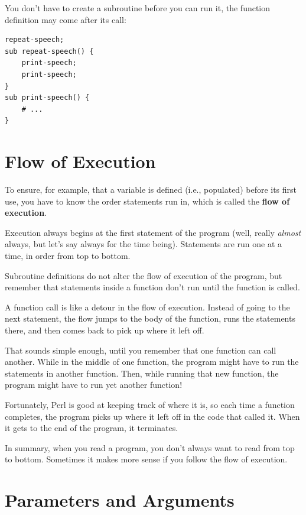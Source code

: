 You don't have to create a subroutine before you can run it, 
the function definition may come after its call:
\begin{verbatim}
repeat-speech;
sub repeat-speech() {
    print-speech;
    print-speech;
}
sub print-speech() {
    # ...
}
\end{verbatim}


\section{Flow of Execution}

To ensure, for example, that a variable is defined (i.e., populated) 
before its first use, you have to know the order statements run in, 
which is called the {\bf flow of execution}.

Execution always begins at the first statement of the program 
(well, really \emph{almost} always, but let's say always 
for the time being). Statements are run one at a time, 
in order from top to bottom.

Subroutine definitions do not alter the flow of execution of the
program, but remember that statements inside a function don't
run until the function is called.

A function call is like a detour in the flow of execution. Instead of
going to the next statement, the flow jumps to the body of
the function, runs the statements there, and then comes back
to pick up where it left off.

That sounds simple enough, until you remember that one function can
call another.  While in the middle of one function, the program might
have to run the statements in another function.  Then, while
running that new function, the program might have to run yet
another function!

Fortunately, Perl is good at keeping track of where it is, so each
time a function completes, the program picks up where it left off in
the code that called it.  When it gets to the end of the program,
it terminates.

In summary, when you read a program, you
don't always want to read from top to bottom.  Sometimes it makes
more sense if you follow the flow of execution.


\section{Parameters and Arguments}
\label{parameters}

